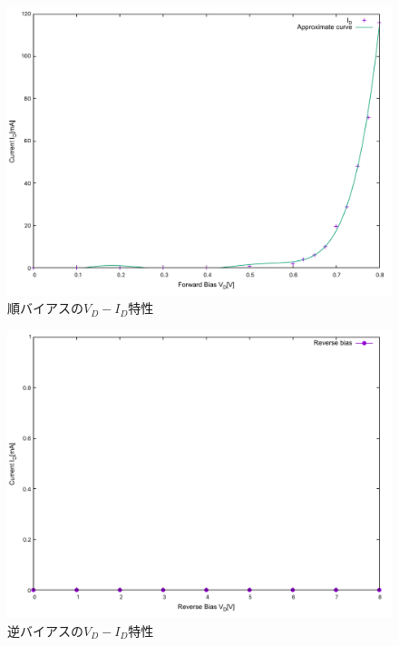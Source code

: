 \begin{itemize}
\begin{figure}[h]
\centering
\includegraphics[scale=0.65]{./data/diode/bias-n.pdf}
\caption{順バイアスの$V_{D}-I_{D}$特性}
\label{fig:vias-graph-n}
\end{figure}
\end{itemize}

\begin{figure}[h]
\centering
\includegraphics[scale=0.65]{./data/diode/bias-rev.pdf}
\caption{逆バイアスの$V_{D}-I_{D}$特性}
\label{fig:bias-rev}
\end{figure}

\clearpage
